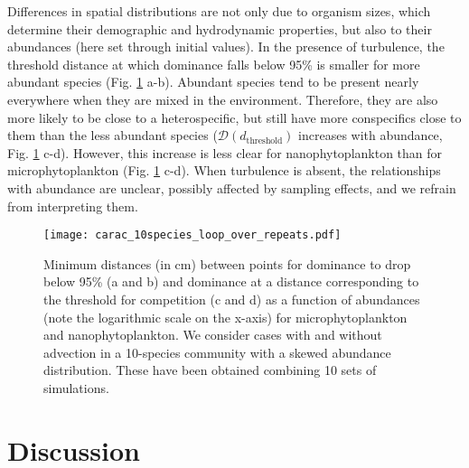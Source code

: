 \documentclass[12pt,english]{article}
\begin{document}
Differences in spatial distributions are not only due to organism
sizes, which determine their demographic and hydrodynamic properties,
but also to their abundances (here set through initial values). In
the presence of turbulence, the threshold distance at which dominance
falls below 95\% is smaller for more abundant species (Fig. \ref{fig:Carac_10sp}
a-b). Abundant species tend to be present nearly everywhere when they
are mixed in the environment. Therefore, they are also more likely
to be close to a heterospecific, but still have more conspecifics
close to them than the less abundant species ($\mathcal{D}\left(d_{\text{threshold}}\right)$
increases with abundance, Fig. \ref{fig:Carac_10sp} c-d). However,
this increase is less clear for nanophytoplankton than for microphytoplankton
(Fig. \ref{fig:Carac_10sp} c-d). When turbulence is absent, the relationships
with abundance are unclear, possibly affected by sampling effects,
and we refrain from interpreting them.

\begin{figure}[H]
\begin{centering}
\texttt{[image: carac\_10species\_loop\_over\_repeats.pdf]} 
\par\end{centering}
\caption{Minimum distances (in cm) between points for dominance to drop below
95\% (a and b) and dominance at a distance corresponding to the threshold
for competition (c and d) as a function of abundances (note the logarithmic
scale on the x-axis) for microphytoplankton and nanophytoplankton.
We consider cases with and without advection in a 10-species community
with a skewed abundance distribution. These have been obtained combining 10 sets of simulations. \label{fig:Carac_10sp}}
\end{figure}


\section*{Discussion}
\end{document}
